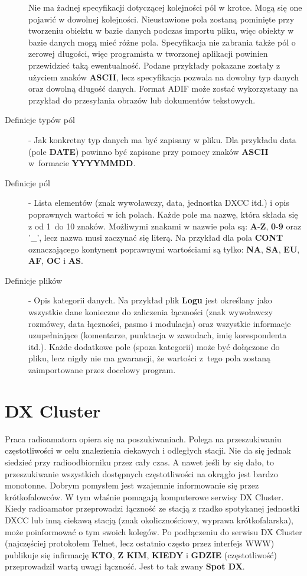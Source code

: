 \documentclass[]{mgr}
\begin{document}
\begin{description}
                Nie ma żadnej specyfikacji dotyczącej kolejności pól w krotce. Mogą się one pojawić w dowolnej kolejności. Nieustawione pola zostaną pominięte przy tworzeniu obiektu w bazie danych podczas importu pliku, więc obiekty w bazie danych mogą mieć różne pola. Specyfikacja nie zabrania także pól o zerowej długości, więc programista w tworzonej aplikacji powinien przewidzieć taką ewentualność. Podane przykłady pokazane zostały z użyciem znaków \textbf{ASCII}, lecz specyfikacja pozwala na dowolny typ danych oraz dowolną długość danych. Format ADIF może zostać wykorzystany na przykład do przesyłania obrazów lub dokumentów tekstowych. 
                \item[Definicje typów pól] - Jak konkretny typ danych ma być zapisany w pliku. Dla przykładu data (pole \textbf{DATE}) powinno być zapisane przy pomocy znaków \textbf{ASCII} w~formacie \textbf{YYYYMMDD}.
                \item[Definicje pól] - Lista elementów (znak wywoławczy, data, jednostka DXCC itd.) i opis poprawnych wartości w ich polach. Każde pole ma nazwę, która składa się z od 1~do 10 znaków. Możliwymi znakami w nazwie pola są: \textbf{A}-\textbf{Z}, \textbf{0}-\textbf{9} oraz '\_', lecz nazwa musi zaczynać się literą. Na przykład dla pola \textbf{CONT} oznaczającego kontynent poprawnymi wartościami są tylko: \textbf{NA}, \textbf{SA}, \textbf{EU}, \textbf{AF}, \textbf{OC} i \textbf{AS}.
                \item[Definicje plików] - Opis kategorii danych. Na przykład plik \textbf{Logu} jest określany jako wszystkie dane konieczne do zaliczenia łączności (znak wywoławczy rozmówcy, data łączności, pasmo i modulacja) oraz wszystkie informacje uzupełniające (komentarze, punktacja w zawodach, imię korespondenta itd.). Każde dodatkowe pole (spoza kategorii) może być dołączone do pliku, lecz nigdy nie ma gwarancji, że wartości z~tego pola zostaną zaimportowane przez docelowy program.
            \end{description}

        \section{DX Cluster}
        \label{sec:dxcluster}
        Praca radioamatora opiera się na poszukiwaniach. Polega na przeszukiwaniu częstotliwości w celu znalezienia ciekawych i odległych stacji. Nie da się jednak siedzieć przy radioodbiorniku przez cały czas. A nawet jeśli by się dało, to przeszukiwanie wszystkich dostępnych częstotliwości na okrągło jest bardzo monotonne. Dobrym pomysłem jest wzajemnie informowanie się przez krótkofalowców. W tym właśnie pomagają komputerowe serwisy DX Cluster. Kiedy radioamator przeprowadzi łączność ze stacją z rzadko spotykanej jednostki DXCC lub inną ciekawą stacją (znak okolicznościowy, wyprawa krótkofalarska), może poinformować o tym swoich kolegów. Po podłączeniu do serwisu DX Cluster (najczęściej protokołem Telnet, lecz ostatnio często przez interfejs WWW) publikuje się infirmację \textbf{KTO}, \textbf{Z KIM}, \textbf{KIEDY} i \textbf{GDZIE} (częstotliwość) przeprowadził wartą uwagi łączność. Jest to tak zwany \textbf{Spot DX}. 
\end{document}

